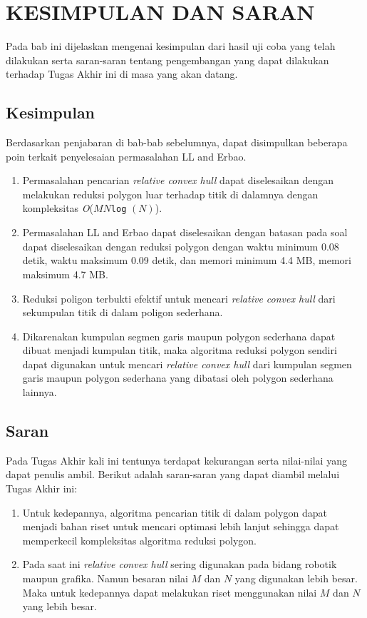 \chapter{KESIMPULAN DAN SARAN}
Pada bab ini dijelaskan mengenai kesimpulan dari hasil uji coba yang telah dilakukan serta saran-saran tentang pengembangan yang dapat dilakukan terhadap Tugas Akhir ini di masa yang akan datang.
\section{ Kesimpulan}
Berdasarkan penjabaran di bab-bab sebelumnya, dapat disimpulkan beberapa poin terkait penyelesaian permasalahan LL and Erbao.
\begin{enumerate}
\item Permasalahan pencarian \textit{relative convex hull} dapat diselesaikan dengan melakukan reduksi polygon luar terhadap titik di dalamnya dengan kompleksitas \textit{O}($MN$\texttt{log} $(N)$).
\item Permasalahan LL and Erbao dapat diselesaikan dengan batasan pada soal dapat diselesaikan dengan reduksi polygon dengan waktu minimum 0.08 detik, waktu maksimum 0.09 detik, dan memori minimum 4.4 MB, memori maksimum 4.7 MB.
\item Reduksi poligon terbukti efektif untuk mencari \textit{relative convex hull} dari sekumpulan titik di dalam poligon sederhana.
\item Dikarenakan kumpulan segmen garis maupun polygon sederhana dapat dibuat menjadi kumpulan titik, maka algoritma reduksi polygon sendiri dapat digunakan untuk mencari \textit{relative convex hull} dari kumpulan segmen garis maupun polygon sederhana yang dibatasi oleh polygon sederhana lainnya.
\end{enumerate}
\section{ Saran}
Pada Tugas Akhir kali ini tentunya terdapat kekurangan serta nilai-nilai yang dapat penulis ambil. Berikut adalah saran-saran yang dapat diambil melalui Tugas Akhir ini:
\begin{enumerate}
 \item Untuk kedepannya, algoritma pencarian titik di dalam polygon dapat menjadi bahan riset untuk mencari optimasi lebih lanjut sehingga dapat memperkecil kompleksitas algoritma reduksi polygon.
 \item Pada saat ini \textit{relative convex hull} sering digunakan pada bidang robotik maupun grafika. Namun besaran nilai $M$ dan $N$ yang digunakan lebih besar. Maka untuk kedepannya dapat melakukan riset menggunakan nilai $M$ dan $N$ yang lebih besar.
\end{enumerate}